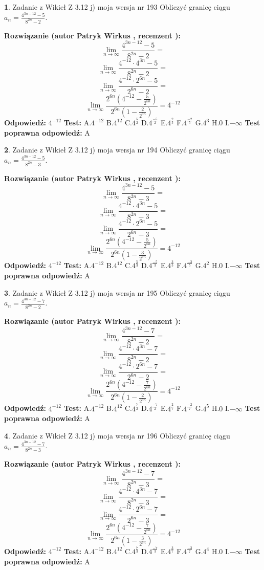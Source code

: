 \documentclass[12pt, a4paper]{article}
\theoremstyle{definition} %
\newtheorem{zad}{}
\newcommand{\zadStart}[1]{\begin{zad}#1\newline}
\newcommand{\zadStop}{\end{zad}}
\newcommand{\rozwStart}[2]{\noindent \textbf{Rozwiązanie (autor #1 , recenzent #2): }\newline}
\newcommand{\rozwStop}{\newline}
\newcommand{\odpStart}{\noindent \textbf{Odpowiedź:}\newline}
\newcommand{\odpStop}{\newline}
\newcommand{\testStart}{\noindent \textbf{Test:}\newline}
\newcommand{\testStop}{\newline}
\newcommand{\kluczStart}{\noindent \textbf{Test poprawna odpowiedź:}\newline}
\newcommand{\kluczStop}{\newline}
\begin{document}
\zadStart{Zadanie z Wikieł Z 3.12 j) moja wersja nr 193}
Obliczyć granicę ciągu $a_{n}=\frac{4^{3n-12}-5}{8^{2n}-2}$.
\zadStop
\rozwStart{Patryk Wirkus}{}
$$\lim\limits_{n\to\infty}\frac{4^{3n-12}-5}{8^{2n}-2}=$$
$$\lim\limits_{n\to\infty}\frac{4^{-12} \cdot 4^{3n}-5}{8^{2n}-2}=$$
$$\lim\limits_{n\to\infty}\frac{4^{-12} \cdot 2^{6n}-5}{2^{6n}-2}=$$
$$\lim\limits_{n\to\infty}\frac{2^{6n}(4^{-12} - \frac{5}{2^{6n}})}{2^{6n}(1-\frac{2}{2^{6n}})}= 4^{-12}$$
\rozwStop
\odpStart
$4^{-12}$
\odpStop
\testStart
A.$4^{-12}$
B.$4^{12}$
C.$4^{\frac{5}{2}}$
D.$4^{\frac{-5}{2}}$
E.$4^{\frac{2}{5}}$
F.$4^{\frac{-2}{5}}$
G.$4^{3}$
H.$0$
I.$-\infty$
\testStop
\kluczStart
A
\kluczStop



\zadStart{Zadanie z Wikieł Z 3.12 j) moja wersja nr 194}
Obliczyć granicę ciągu $a_{n}=\frac{4^{3n-12}-5}{8^{2n}-3}$.
\zadStop
\rozwStart{Patryk Wirkus}{}
$$\lim\limits_{n\to\infty}\frac{4^{3n-12}-5}{8^{2n}-3}=$$
$$\lim\limits_{n\to\infty}\frac{4^{-12} \cdot 4^{3n}-5}{8^{2n}-3}=$$
$$\lim\limits_{n\to\infty}\frac{4^{-12} \cdot 2^{6n}-5}{2^{6n}-3}=$$
$$\lim\limits_{n\to\infty}\frac{2^{6n}(4^{-12} - \frac{5}{2^{6n}})}{2^{6n}(1-\frac{3}{2^{6n}})}= 4^{-12}$$
\rozwStop
\odpStart
$4^{-12}$
\odpStop
\testStart
A.$4^{-12}$
B.$4^{12}$
C.$4^{\frac{5}{3}}$
D.$4^{\frac{-5}{3}}$
E.$4^{\frac{3}{5}}$
F.$4^{\frac{-3}{5}}$
G.$4^{2}$
H.$0$
I.$-\infty$
\testStop
\kluczStart
A
\kluczStop



\zadStart{Zadanie z Wikieł Z 3.12 j) moja wersja nr 195}
Obliczyć granicę ciągu $a_{n}=\frac{4^{3n-12}-7}{8^{2n}-2}$.
\zadStop
\rozwStart{Patryk Wirkus}{}
$$\lim\limits_{n\to\infty}\frac{4^{3n-12}-7}{8^{2n}-2}=$$
$$\lim\limits_{n\to\infty}\frac{4^{-12} \cdot 4^{3n}-7}{8^{2n}-2}=$$
$$\lim\limits_{n\to\infty}\frac{4^{-12} \cdot 2^{6n}-7}{2^{6n}-2}=$$
$$\lim\limits_{n\to\infty}\frac{2^{6n}(4^{-12} - \frac{7}{2^{6n}})}{2^{6n}(1-\frac{2}{2^{6n}})}= 4^{-12}$$
\rozwStop
\odpStart
$4^{-12}$
\odpStop
\testStart
A.$4^{-12}$
B.$4^{12}$
C.$4^{\frac{7}{2}}$
D.$4^{\frac{-7}{2}}$
E.$4^{\frac{2}{7}}$
F.$4^{\frac{-2}{7}}$
G.$4^{5}$
H.$0$
I.$-\infty$
\testStop
\kluczStart
A
\kluczStop



\zadStart{Zadanie z Wikieł Z 3.12 j) moja wersja nr 196}
Obliczyć granicę ciągu $a_{n}=\frac{4^{3n-12}-7}{8^{2n}-3}$.
\zadStop
\rozwStart{Patryk Wirkus}{}
$$\lim\limits_{n\to\infty}\frac{4^{3n-12}-7}{8^{2n}-3}=$$
$$\lim\limits_{n\to\infty}\frac{4^{-12} \cdot 4^{3n}-7}{8^{2n}-3}=$$
$$\lim\limits_{n\to\infty}\frac{4^{-12} \cdot 2^{6n}-7}{2^{6n}-3}=$$
$$\lim\limits_{n\to\infty}\frac{2^{6n}(4^{-12} - \frac{7}{2^{6n}})}{2^{6n}(1-\frac{3}{2^{6n}})}= 4^{-12}$$
\rozwStop
\odpStart
$4^{-12}$
\odpStop
\testStart
A.$4^{-12}$
B.$4^{12}$
C.$4^{\frac{7}{3}}$
D.$4^{\frac{-7}{3}}$
E.$4^{\frac{3}{7}}$
F.$4^{\frac{-3}{7}}$
G.$4^{4}$
H.$0$
I.$-\infty$
\testStop
\kluczStart
A
\kluczStop
\end{document}
